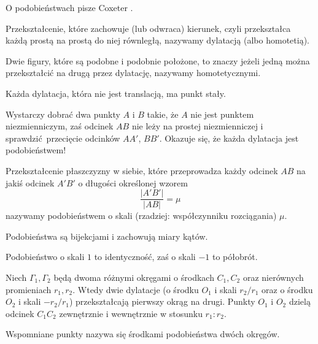 %

O podobieństwach pisze Coxeter \cite[s. 84-92]{coxeter_1967}.

\begin{definition}[homotetia]
    Przekształcenie, które zachowuje (lub odwraca) kierunek, czyli przekształca każdą prostą na prostą do niej równległą, nazywamy dylatacją (albo homotetią).
\end{definition}

Dwie figury, które są podobne i podobnie położone, to znaczy jeżeli jedną można przekształcić na drugą przez dylatację, nazywamy homotetycznymi.

\begin{proposition}
    Każda dylatacja, która nie jest translacją, ma punkt stały.
\end{proposition}

Wystarczy dobrać dwa punkty $A$ i $B$ takie, że $A$ nie jest punktem niezmienniczym, zaś odcinek $AB$ nie leży na prostej niezmienniczej i sprawdzić przecięcie odcinków $AA'$, $BB'$.
Okazuje się, że każda dylatacja jest podobieństwem!

\begin{definition}[podobieństwo]
    Przekształcenie płaszczyzny w siebie, które przeprowadza każdy odcinek $AB$ na jakiś odcinek $A'B'$ o długości określonej wzorem
    \begin{equation}
        \frac{|A'B'|}{|AB|} = \mu
    \end{equation}
    nazywamy podobieństwem o skali (rzadziej: współczynniku rozciągania) $\mu$.
\end{definition}

Podobieństwa są bijekcjami i zachowują miary kątów.

\begin{example}
    Podobieństwo o skali $1$ to identyczność, zaś o skali $-1$ to półobrót. 
\end{example}

\begin{proposition}
    Niech $\Gamma_1, \Gamma_2$ będą dwoma różnymi okręgami o środkach $C_1, C_2$ oraz nierównych promieniach $r_1, r_2$.
    Wtedy dwie dylatacje (o środku $O_1$ i skali $r_2/r_1$ oraz o środku $O_2$ i skali $-r_2/r_1$) przekształcają pierwszy okrąg na drugi.
    Punkty $O_1$ i $O_2$ dzielą odcinek $C_1 C_2$ zewnętrznie i wewnętrznie w stosunku $r_1 : r_2$.
\end{proposition}

Wspomniane punkty nazywa się środkami podobieństwa dwóch okręgów.

